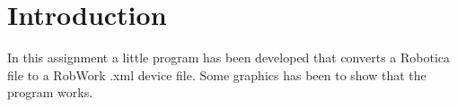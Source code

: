 \section{Introduction}
\label{sec:intro}


In this assignment a little program has been developed that converts a Robotica file to a RobWork .xml device file.
Some graphics has been to show that the program works.
